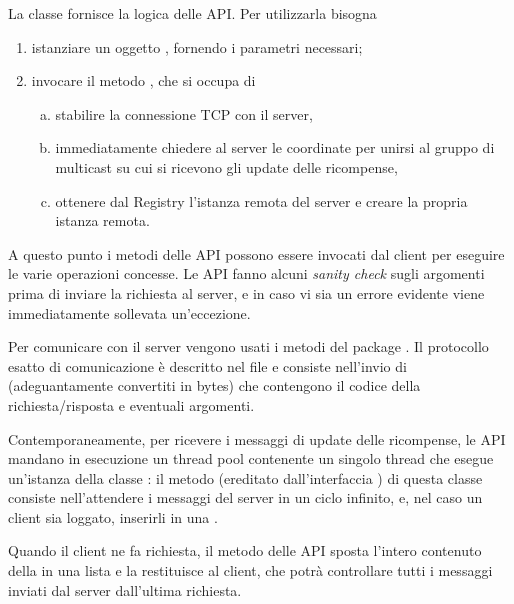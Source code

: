 \documentclass[
    oneside,
    10pt,
    language=italian,
    a4paper,
    article
]{notes}
\begin{document}
La classe  fornisce la logica delle API. Per utilizzarla bisogna
\begin{enumerate}[(1)]
    \item istanziare un oggetto , fornendo i parametri necessari;
    \item invocare il metodo , che si occupa di 
    \begin{enumerate}[(a)]
        \item stabilire la connessione TCP con il server,
        \item immediatamente chiedere al server le coordinate per unirsi al gruppo 
        di multicast su cui si ricevono gli update delle ricompense,
        \item ottenere dal Registry l'istanza remota del server e creare la propria
        istanza remota.
    \end{enumerate}
\end{enumerate}

A questo punto i metodi delle API possono essere invocati dal client per
eseguire le varie operazioni concesse. Le API fanno alcuni \emph{sanity check}
sugli argomenti prima di inviare la richiesta al server, e in caso vi sia un
errore evidente viene immediatamente sollevata un'eccezione.

Per comunicare con il server vengono usati i metodi del package 
. Il protocollo esatto di comunicazione è descritto nel file
 e consiste nell'invio di  (adeguantamente
convertiti in bytes) che contengono il codice della richiesta/risposta e eventuali
argomenti.

Contemporaneamente, per ricevere i messaggi di update delle ricompense, le API
mandano in esecuzione un thread pool contenente un singolo thread che esegue 
un'istanza della classe : il metodo 
(ereditato dall'interfaccia ) di questa classe consiste
nell'attendere i messaggi del server in un ciclo infinito, e, nel caso un client
sia loggato, inserirli in una .

Quando il client ne fa richiesta, il metodo  delle
API sposta l'intero contenuto della  in una lista e la
restituisce al client, che potrà controllare tutti i messaggi inviati dal server
dall'ultima richiesta.
\end{document}
